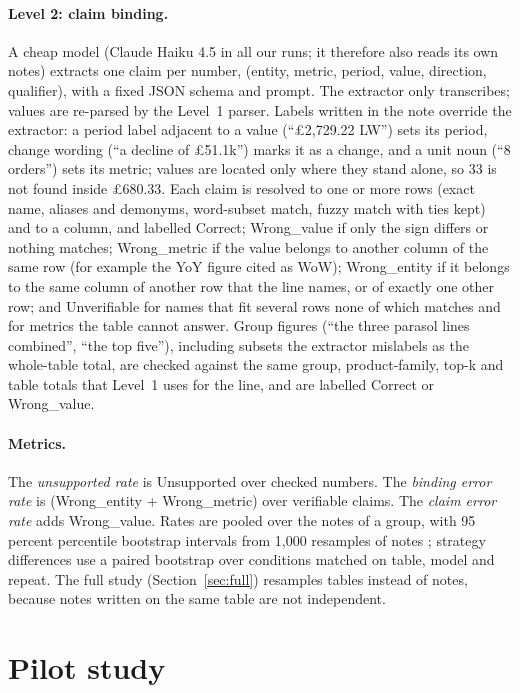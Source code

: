 \documentclass[11pt]{article}
\begin{document}
\paragraph{Level 2: claim binding.} A cheap model (Claude Haiku 4.5 in all our runs; it therefore also reads its own notes) extracts one claim per number, (entity, metric, period, value, direction, qualifier), with a fixed JSON schema and prompt. The extractor only transcribes; values are re-parsed by the Level~1 parser. Labels written in the note override the extractor: a period label adjacent to a value (``\pounds2,729.22 LW'') sets its period, change wording (``a decline of \pounds51.1k'') marks it as a change, and a unit noun (``8 orders'') sets its metric; values are located only where they stand alone, so 33 is not found inside \pounds680.33. Each claim is resolved to one or more rows (exact name, aliases and demonyms, word-subset match, fuzzy match with ties kept) and to a column, and labelled Correct; Wrong\_value if only the sign differs or nothing matches; Wrong\_metric if the value belongs to another column of the same row (for example the YoY figure cited as WoW); Wrong\_entity if it belongs to the same column of another row that the line names, or of exactly one other row; and Unverifiable for names that fit several rows none of which matches and for metrics the table cannot answer. Group figures (``the three parasol lines combined'', ``the top five''), including subsets the extractor mislabels as the whole-table total, are checked against the same group, product-family, top-k and table totals that Level~1 uses for the line, and are labelled Correct or Wrong\_value.

\paragraph{Metrics.} The \emph{unsupported rate} is Unsupported over checked numbers. The \emph{binding error rate} is (Wrong\_entity + Wrong\_metric) over verifiable claims. The \emph{claim error rate} adds Wrong\_value. Rates are pooled over the notes of a group, with 95 percent percentile bootstrap intervals from 1,000 resamples of notes \citep{efron1993bootstrap}; strategy differences use a paired bootstrap over conditions matched on table, model and repeat. The full study (Section~\ref{sec:full}) resamples tables instead of notes, because notes written on the same table are not independent.

\section{Pilot study}
\label{sec:pilot}
\end{document}
